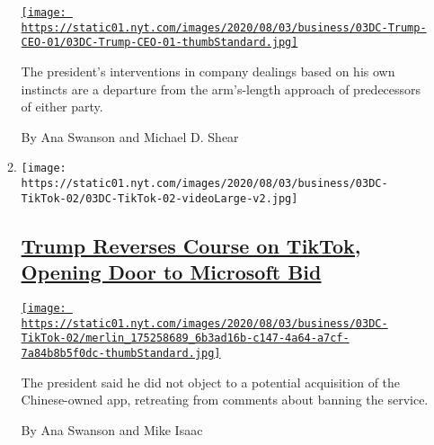 \begin{enumerate}
\begin{enumerate}
    \href{/2020/08/03/business/economy/trump-tiktok-china-business.html}{\texttt{[image: https://static01.nyt.com/images/2020/08/03/business/03DC-Trump-CEO-01/03DC-Trump-CEO-01-thumbStandard.jpg]}}

    The president's interventions in company dealings based on his own
    instincts are a departure from the arm's-length approach of
    predecessors of either party.

    By Ana Swanson and Michael D. Shear
  \item
    \texttt{[image: https://static01.nyt.com/images/2020/08/03/business/03DC-TikTok-02/03DC-TikTok-02-videoLarge-v2.jpg]}

    \hypertarget{trump-reverses-course-on-tiktok-opening-door-to-microsoft-bid}{%
    \subsection{\texorpdfstring{\href{/2020/08/03/technology/trump-tiktok-microsoft.html}{Trump
    Reverses Course on TikTok, Opening Door to Microsoft
    Bid}}{Trump Reverses Course on TikTok, Opening Door to Microsoft Bid}}\label{trump-reverses-course-on-tiktok-opening-door-to-microsoft-bid}}

    \href{/2020/08/03/technology/trump-tiktok-microsoft.html}{\texttt{[image: https://static01.nyt.com/images/2020/08/03/business/03DC-TikTok-02/merlin\_175258689\_6b3ad16b-c147-4a64-a7cf-7a84b8b5f0dc-thumbStandard.jpg]}}

    The president said he did not object to a potential acquisition of
    the Chinese-owned app, retreating from comments about banning the
    service.

    By Ana Swanson and Mike Isaac
  \end{enumerate}
\end{enumerate}

